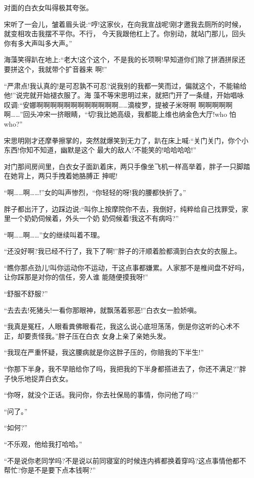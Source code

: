 \documentclass[11pt,a4paper,onecolumn]{article}
\begin{document}
对面的白衣女叫得极其夸张。

宋听了一会儿，皱着眉头说:``哼!这家伙，在向我宣战呢!刚才邀我去厕所的时候，就变相攻击我摆不平你。不行，
今天我跟他杠上了。你别动，就站门那儿，回头你有多大声叫多大声。''

海藻笑得趴在地上:``老大!这个这个，不是我的长项啊!早知道你们除了拼酒拼尿还要拼这个，我就带个扩音器来
啊!''

``严肃点!我认真的!是可忍孰不可忍?说我别的我都一笑而过，偏就这个，不能输给他!''说完就开始褪衣服了。海
藻不等宋思明过来，就把门开了一条缝，开始唱咏叹调:``安娜啊啊啊啊啊啊啊啊啊啊啊啊……滴梭罗，提被子米呀啊
啊啊啊啊啊啊……''回头冲宋一挤眼睛，``切!我比她高级，我都能上维也纳金色大厅!who 怕who?''

宋思明刚才还摩拳擦掌的，突然就爆笑到无力了，趴在床上喊:``关门关门，你个小东西!你知不知道，幽默是这个
最大的敌人?不能笑的!哈哈哈哈!''

对门那间房间里，白衣女子面趴着床，两只手像坐飞机一样高举着，胖子一只脚踏在她背上，两只手拽着她胳膊正
抻呢!

``啊……啊……!''女的叫声惨烈，``你轻轻的呀!我的腰都快折了。''

胖子都出汗了，边踩边说:``叫你上按摩院你不去，我倒好，纯粹给自己找罪受，家里一个奶奶伺候着，外头一个奶
奶伺候着!我这不有病吗?''

``啊……啊……''女的继续叫着不理。

``还没好啊?我已经不行了，我下了啊!''胖子的汗顺着脸都滴到白衣女的衣服上。

``瞧你那点劲儿!叫你运动你不运动，干这点事都嫌累。人家那不是椎间盘不好吗，让你踩那是对你的信任，旁人谁
能随便摸我呀!''

``舒服不舒服?''

``去去去!死猪头!一看你那眼神，就飘荡着邪恶!''白衣女一脸娇嗔。

``我真是冤枉，人眼看粪佛眼看花，我这么说心底坦荡荡，倒是你这听的心术不正，却要责怪我。''胖子压在白衣
女身上亲了亲她头发。

``我现在严重怀疑，我这腰病就是你这胖子压的，你赔我的下半生!''

``你那下半身，我不早赔给你了吗，我把我的下半身都搭进去了，你还不满足?''胖子快乐地捉弄白衣女。

``你呀，就没个正话。我问你，你去社保局的事情，你问他了吗?''

``问了。''

``如何?''

``不乐观，他给我打哈哈。''

``不是说你老同学吗?不是说以前同寝室的时候连内裤都换着穿吗?这点事情他都不帮忙?你是不是要下点本钱啊?''
\end{document}
